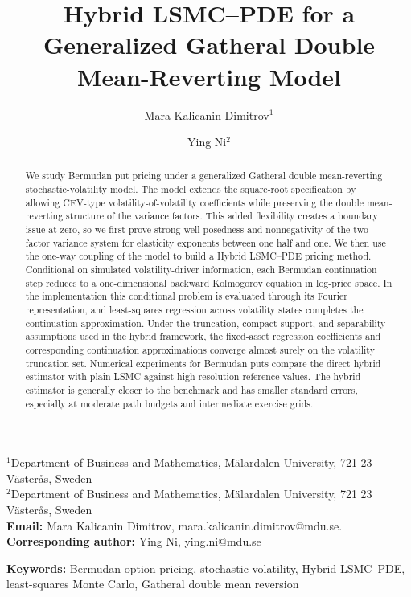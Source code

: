 \documentclass[10pt]{article}
\title{Hybrid LSMC--PDE for a Generalized Gatheral Double Mean-Reverting Model}
\author{%
Mara Kalicanin Dimitrov$^{1}$ \and
Ying Ni$^{2}$%
}
\date{}
\theoremstyle{plain}
\theoremstyle{definition}
\theoremstyle{remark}
\newcommand{\keywords}[1]{\par\noindent\textbf{Keywords:} #1\par}
\begin{document}
\maketitle

\begin{center}
\small
$^{1}$Department of Business and Mathematics, M\"{a}lardalen University, 721 23 V\"{a}ster{\aa}s, Sweden\\
$^{2}$Department of Business and Mathematics, M\"{a}lardalen University, 721 23 V\"{a}ster{\aa}s, Sweden\\[4pt]
\textbf{Email:} Mara Kalicanin Dimitrov, mara.kalicanin.dimitrov@mdu.se.\\
\textbf{Corresponding author:} Ying Ni, ying.ni@mdu.se\\
\end{center}

\begin{abstract}
We study Bermudan put pricing under a generalized Gatheral double mean-reverting stochastic-volatility model. The model extends the square-root specification by allowing CEV-type volatility-of-volatility coefficients while preserving the double mean-reverting structure of the variance factors. This added flexibility creates a boundary issue at zero, so we first prove strong well-posedness and nonnegativity of the two-factor variance system for elasticity exponents between one half and one. We then use the one-way coupling of the model to build a Hybrid LSMC--PDE pricing method. Conditional on simulated volatility-driver information, each Bermudan continuation step reduces to a one-dimensional backward Kolmogorov equation in log-price space. In the implementation this conditional problem is evaluated through its Fourier representation, and least-squares regression across volatility states completes the continuation approximation. Under the truncation, compact-support, and separability assumptions used in the hybrid framework, the fixed-asset regression coefficients and corresponding continuation approximations converge almost surely on the volatility truncation set. Numerical experiments for Bermudan puts compare the direct hybrid estimator with plain LSMC against high-resolution reference values. The hybrid estimator is generally closer to the benchmark and has smaller standard errors, especially at moderate path budgets and intermediate exercise grids.
\end{abstract}

\keywords{Bermudan option pricing, stochastic volatility, Hybrid LSMC--PDE, least-squares Monte Carlo, Gatheral double mean reversion}
\end{document}
